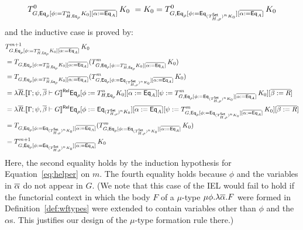 \documentclass{lmcs}
\theoremstyle{plain}\newtheorem{satz}[thm]{Satz}
\newcommand{\set}{\mathsf{Set}}
\begin{document}
{\begin{itemize}
\begin{itemize}
\[T^0_{G,
  \Eq_{\rho}[\phi := T^{n}_{H,\Eq_{\rho}} K_0][\overline{\alpha :=
      \Eq_A}]}\,K_0 \ = K_0 = T^0_{G, \Eq_{\rho}[\phi :=
    \Eq_{(T^{\set}_{H,\rho})^n K_0}][\overline{\alpha :=
      \Eq_A}]}\,K_0\]
and the inductive case is proved by: \\
\begin{align*}
& T^{m+1}_{G, \Eq_{\rho}[\phi := T^{n}_{H,\Eq_{\rho}} K_0][\overline{\alpha := \Eq_A}]}\,K_0 \\
&= T_{G, \Eq_{\rho}[\phi := T^{n}_{H,\Eq_{\rho}} K_0][\overline{\alpha
        := \Eq_A}]} (T^{m}_{G, \Eq_{\rho}[\phi := T^{n}_{H,\Eq_{\rho}}
      K_0][\overline{\alpha := \Eq_A}]}\,K_0) \\
&= T_{G, \Eq_{\rho}[\phi := T^{n}_{H,\Eq_{\rho}} K_0][\overline{\alpha
        := \Eq_A}]} (T^{m}_{G, \Eq_{\rho}[\phi :=
      \Eq_{(T^{\set}_{H,\rho})^n K_0}][\overline{\alpha :=
        \Eq_A}]}\,K_0) \\
&= \lambda \ol{R}. \relsem{\Gamma; \psi,
    \ol\beta \vdash G} \Eq_{\rho} [\phi := T^{n}_{H,\Eq_{\rho}}
    K_0][\overline{\alpha := \Eq_A}][\psi := T^{m}_{G, \Eq_{\rho}[\phi
        := \Eq_{(T^{\set}_{H,\rho})^n K_0}][\overline{\alpha :=
          \Eq_A}]}\,K_0][\overline{\beta := R}] \\
&= \lambda \ol{R}. \relsem{\Gamma; \psi,
    \ol\beta \vdash G} \Eq_{\rho} [\phi := \Eq_{(T^{\set}_{H,\rho})^n
      K_0}][\overline{\alpha := \Eq_A}][\psi := T^{m}_{G,
      \Eq_{\rho}[\phi := \Eq_{(T^{\set}_{H,\rho})^n
          K_0}][\overline{\alpha := \Eq_A}]}\,K_0][\overline{\beta :=
      R}] \\
&= T_{G, \Eq_{\rho}[\phi := \Eq_{(T^{\set}_{H,\rho})^n
        K_0}][\overline{\alpha := \Eq_A}]} (T^{m}_{G, \Eq_{\rho}[\phi
      := \Eq_{(T^{\set}_{H,\rho})^n K_0}][\overline{\alpha :=
        \Eq_A}]}\,K_0) \\
&= T^{m+1}_{G, \Eq_{\rho}[\phi := \Eq_{(T^{\set}_{H,\rho})^n
        K_0}][\overline{\alpha := \Eq_A}]}\,K_0
\end{align*}
Here, the second equality holds by the induction hypothesis for
Equation~\ref{eq:helper} on $m$. The fourth equality holds because
$\phi$ and the variables in $\overline{\alpha}$ do not appear in $G$. (We note
that this case of the IEL would fail to hold if the functorial context
in which the body $F$ of a $\mu$-type $\mu \phi. \lambda
\overline{\alpha}. F$ were formed in Definition~\ref{def:wftypes} were
extended to contain variables other than $\phi$ and the $\alpha$s.
This justifies our design of the $\mu$-type formation rule there.)
\end{itemize}

\end{itemize}}
\end{document}
